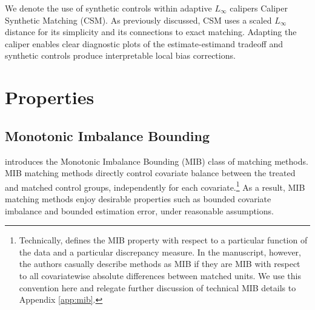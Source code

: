 \documentclass{article}
\begin{document}
We denote the use of synthetic controls within adaptive $L_\infty$ calipers Caliper Synthetic Matching (CSM).
As previously discussed, CSM uses a scaled $L_\infty$ distance for its simplicity and its connections to exact matching.
Adapting the caliper enables clear diagnostic plots of the estimate-estimand tradeoff and synthetic controls produce interpretable local bias corrections.

\section{Properties}
\label{sec:properties}
\subsection{Monotonic Imbalance Bounding}
\label{sec:mib}

\citet{iacus2011multivariate} introduces the Monotonic Imbalance Bounding (MIB) class of matching methods.
MIB matching methods directly control covariate balance between the treated and matched control groups, independently for each covariate.\footnote{Technically, \cite{iacus2011multivariate} defines the MIB property with respect to a particular function of the data and a particular discrepancy measure.
In the manuscript, however, the authors casually describe methods as MIB if they are MIB with respect to all covariatewise absolute differences between matched units.
We use this convention here and relegate further discussion of technical MIB details to Appendix \ref{app:mib}.}
As a result, MIB matching methods enjoy desirable properties such as bounded covariate imbalance and bounded estimation error, under reasonable assumptions.
\end{document}
